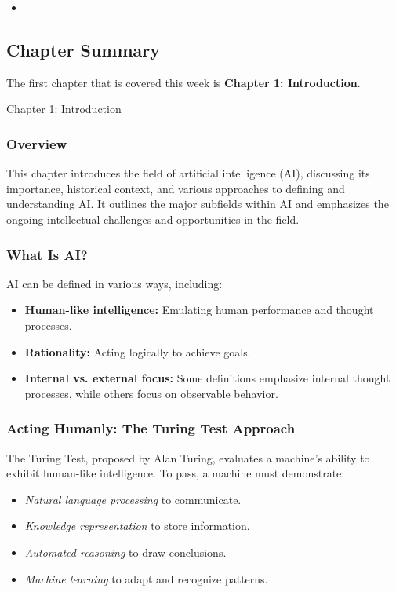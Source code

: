 \begin{itemize}
    \item {}
\end{itemize}

\newpage

\subsection{Chapter Summary}

The first chapter that is covered this week is \textbf{Chapter 1: Introduction}.

\begin{notes}{Chapter 1: Introduction}
    \subsubsection*{Overview}

    This chapter introduces the field of artificial intelligence (AI), discussing its importance, historical context, and various approaches to defining and understanding AI. It outlines the major 
    subfields within AI and emphasizes the ongoing intellectual challenges and opportunities in the field.

    \subsubsection*{What Is AI?}

    AI can be defined in various ways, including:
    \begin{itemize}
        \item \textbf{Human-like intelligence:} Emulating human performance and thought processes.
        \item \textbf{Rationality:} Acting logically to achieve goals.
        \item \textbf{Internal vs. external focus:} Some definitions emphasize internal thought processes, while others focus on observable behavior.
    \end{itemize}

    \subsubsection*{Acting Humanly: The Turing Test Approach}

    The Turing Test, proposed by Alan Turing, evaluates a machine's ability to exhibit human-like intelligence. To pass, a machine must demonstrate:
    \begin{itemize}
        \item \textit{Natural language processing} to communicate.
        \item \textit{Knowledge representation} to store information.
        \item \textit{Automated reasoning} to draw conclusions.
        \item \textit{Machine learning} to adapt and recognize patterns.
    \end{itemize}


\end{notes}
